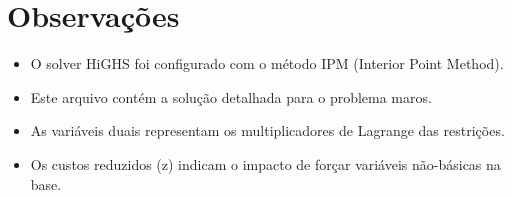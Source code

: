 \documentclass[12pt]{article}
\begin{document}
\begin{longtable}{@{}cc@{}}
\end{longtable}


\section{Observações}

\begin{itemize}
\item O solver HiGHS foi configurado com o método IPM (Interior Point Method).
\item Este arquivo contém a solução detalhada para o problema maros.
\item As variáveis duais representam os multiplicadores de Lagrange das restrições.
\item Os custos reduzidos (z) indicam o impacto de forçar variáveis não-básicas na base.
\end{itemize}
\end{document}
